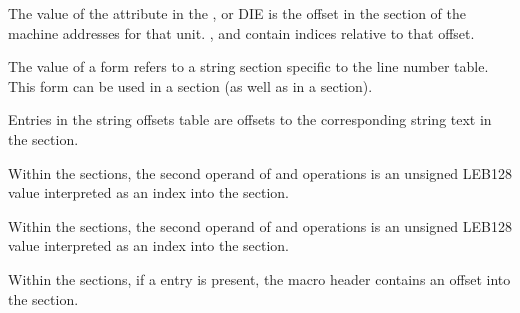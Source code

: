 \begin{description}
The value of the \DWATaddrbase{} attribute in the 
\DWTAGcompileunit, \DWTAGpartialunit{} or \DWTAGtypeunit{} DIE 
is the offset in the \dotdebugaddr{} section of the machine 
addresses for that unit.
\DWFORMaddrxXN, \DWOPaddrx{} and \DWOPconstx{} contain indices 
relative to that offset.

\bb
{}
The value of a \DWFORMlinestrp{} form refers to a string section specific
to the line number table. This form can be used in a \dotdebuglinedwo{} section
(as well as in a \dotdebuginfodwo{} section).

Entries in the string offsets table are offsets to the corresponding string text
in the \dotdebugstrdwo{} section.

Within the \dotdebugmacrodwo{} sections, the second operand of \DWMACROdefinestrx{}
and \DWMACROundefstrx{} operations is an unsigned LEB128 value interpreted as an
index into the \dotdebugstroffsetsdwo{} section.

Within the \dotdebugmacrodwo{} sections, the second operand of \DWMACROdefinestrp{}
and \DWMACROundefstrp{} operations is an unsigned LEB128 value interpreted as an
index into the \dotdebugstrdwo{} section.

Within the \dotdebugmacrodwo{} sections, if a \DWMACROstartfile{} entry is present,
the macro header contains an offset into the \dotdebuglinedwo{} section.

\eb

\end{description}
